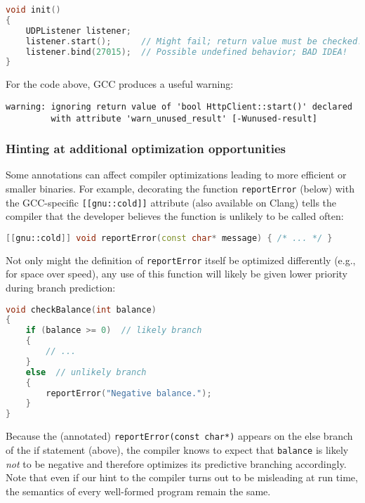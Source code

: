 \begin{lstlisting}[language=C++]
void init()
{
    UDPListener listener;
    listener.start();      // Might fail; return value must be checked!
    listener.bind(27015);  // Possible undefined behavior; BAD IDEA!
}
\end{lstlisting}

\noindent For the code above, GCC produces a useful warning:

\begin{lstlisting}[style=plain]
warning: ignoring return value of 'bool HttpClient::start()' declared
         with attribute 'warn_unused_result' [-Wunused-result]
\end{lstlisting}


\subsubsection[Hinting at additional optimization opportunities]{Hinting at additional optimization opportunities}\label{hinting-at-additional-optimization-opportunities}

Some annotations can affect compiler optimizations leading to more
efficient or smaller binaries. For example, decorating the function
\texttt{reportError} (below) with the GCC-specific
\texttt{[[gnu::cold]]} attribute (also available on Clang) tells the
compiler that the developer believes the function is unlikely to be
called often:

\begin{lstlisting}[language=C++]
[[gnu::cold]] void reportError(const char* message) { /* ... */ }
\end{lstlisting}

\noindent Not only might the definition of \texttt{reportError} itself be
optimized differently (e.g., for space over speed), any use of this
function will likely be given lower priority during branch \mbox{prediction}:

\begin{lstlisting}[language=C++]
void checkBalance(int balance)
{
    if (balance >= 0)  // likely branch
    {
        // ...
    }
    else  // unlikely branch
    {
        reportError("Negative balance.");
    }
}
\end{lstlisting}
 \pagebreak%

\noindent Because the (annotated) \texttt{reportError(const}~\texttt{char*)}
appears on the else branch of the if statement (above), the compiler
knows to expect that \texttt{balance} is likely \emph{not} to be
negative and therefore optimizes its predictive branching accordingly.
Note that even if our hint to the compiler turns out to be misleading at
run time, the semantics of every well-formed program remain the same.

